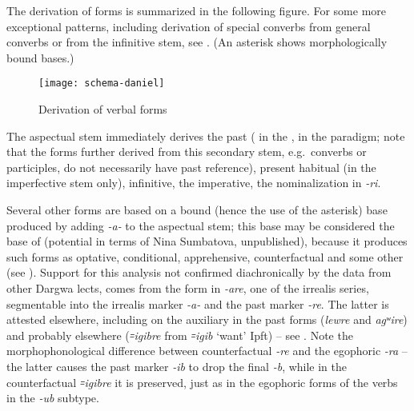 \documentclass[output=paper]{langsci/langscibook}
\begin{document}


The derivation of forms is summarized in the following figure. For some more exceptional patterns, including 
derivation of special converbs from general converbs or from the infinitive stem, see \citet{sheyanova2019}. (An asterisk shows morphologically bound bases.)

\begin{figure}[h]
\texttt{[image: schema-daniel]}

\setcounter{figure}{13}
\caption{Derivation of verbal forms}
\end{figure}


The aspectual stem immediately derives the past ( in the
,  in the  paradigm; note that
the forms further derived from this secondary stem, e.g.\ converbs or
participles, do not necessarily have past reference), present habitual
(in the imperfective stem only), infinitive, the imperative, the
nominalization in \emph{-ri}.

Several other forms are based on a bound (hence the use of the asterisk) base produced by
adding \emph{-a-} to the aspectual stem; this base may be considered the
base of  (potential in terms of Nina Sumbatova, unpublished),
because it produces such forms as optative, conditional, apprehensive,
counterfactual and some other (see \citealt{dobrushina2019}). Support for this
analysis not confirmed diachronically by the data from other Dargwa lects,
comes from the  form in \emph{-are}, one of the
irrealis series, segmentable into the irrealis marker \emph{-a-} and the
past marker \emph{-re}. The latter is attested elsewhere, including on
the auxiliary in the past forms (\emph{lewre} and \emph{agʷire}) and 
probably elsewhere (\emph{꞊igibre} from
\emph{꞊igib} `want' Ipft) – see \citet{dobrushina2019}. Note
the morphophonological difference between counterfactual \emph{-re} and
the egophoric \emph{-ra} – the latter causes the past marker \emph{-ib}
to drop the final \emph{-b}, while in the counterfactual
\emph{꞊igibre} it is preserved, just as in the egophoric forms of
the verbs in the \emph{-ub} subtype.

\end{document}

